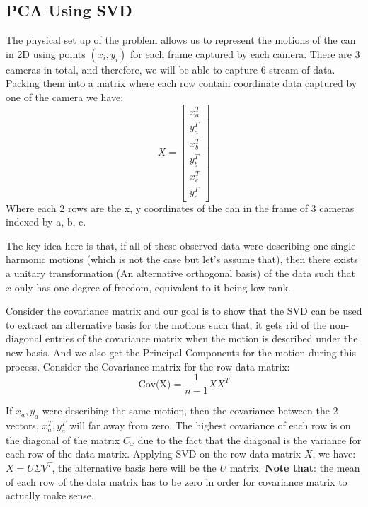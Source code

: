\documentclass{article}
\begin{document}
    \subsection{PCA Using SVD}
        \hspace{1.1em}
        The physical set up of the problem allows us to represent the motions of the can in 2D using points $(x_i, y_i)$ for each frame captured by each camera. There are 3 cameras in total, and therefore, we will be able to capture 6 stream of data. Packing them into a matrix where each row contain coordinate data captured by one of the camera we have: 
        \begin{equation*}\tag{2}\label{eqn:2}
            X = \begin{bmatrix}
                x_{a}^T \\ y_a^T \\ x_b^T \\ y_b^T \\ x_c^T \\ y_c^T
            \end{bmatrix}
        \end{equation*}
        Where each 2 rows are the x, y coordinates of the can in the frame of 3 cameras indexed by a, b, c. 
        \par
        The key idea here is that, if all of these observed data were describing one single harmonic motions (which is not the case but let's assume that), then there exists a unitary transformation (An alternative orthogonal basis) of the data such that $x$ only has one degree of freedom, equivalent to it being low rank\cite{kutz_2013_pg391}.
        \par
        Consider the covariance matrix and our goal is to show that the SVD can be used to extract an alternative basis for the motions such that, it gets rid of the non-diagonal entries of the covariance matrix when the motion is described under the new basis. And we also get the Principal Components for the motion during this process. Consider the Covariance matrix for the row data matrix: 
        \begin{equation*}\tag{3}\label{eqn:3}
            \text{Cov(X)} = \frac{1}{n - 1}XX^T
        \end{equation*}
        \par
        If $x_a, y_a$ were describing the same motion, then the covariance between the 2 vectors, $x_a^T, y_a^T$ will far away from zero. The highest covariance of each row is on the diagonal of the matrix $C_x$ due to the fact that the diagonal is the variance for each row of the data matrix. Applying SVD on the row data matrix $X$, we have: $X = U\Sigma V^T$, the alternative basis here will be the $U$ matrix. \textbf{Note that}: the mean of each row of the data matrix has to be zero in order for covariance matrix to actually make sense. 
\end{document}
